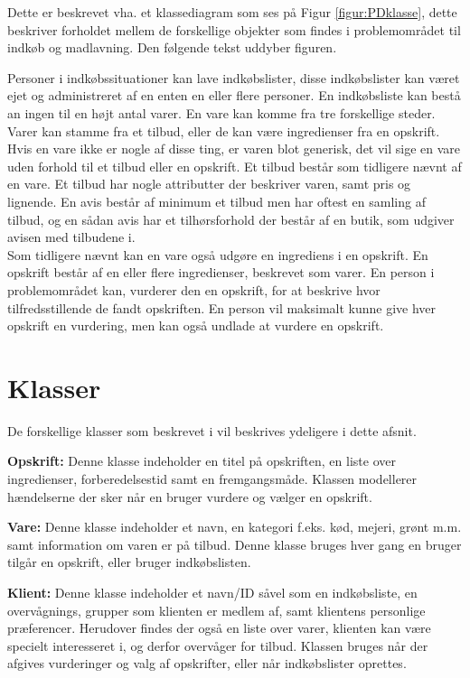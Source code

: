 Dette er beskrevet vha. et klassediagram som ses på Figur \ref{figur:PDklasse}, dette beskriver forholdet mellem de forskellige objekter som findes i problemområdet til indkøb og madlavning. Den følgende tekst uddyber figuren.

Personer i indkøbssituationer kan lave indkøbslister, disse indkøbslister kan været ejet og administreret af en enten en eller flere personer. 
En indkøbsliste kan bestå an ingen til en højt antal varer.
En vare kan komme fra tre forskellige steder.
Varer kan stamme fra et tilbud, eller de kan være ingredienser fra en opskrift. 
Hvis en vare ikke er nogle af disse ting, er varen blot generisk, det vil sige en vare uden forhold til et tilbud eller en opskrift.
Et tilbud består som tidligere nævnt af en vare.
Et tilbud har nogle attributter der beskriver varen, samt pris og lignende.
En avis består af minimum et tilbud men har oftest en samling af tilbud, og en sådan avis har et tilhørsforhold der består af en butik, som udgiver avisen med tilbudene i.\\
Som tidligere nævnt kan en vare også udgøre en ingrediens i en opskrift.
En opskrift består af en eller flere ingredienser, beskrevet som varer.
En person i problemområdet kan, vurderer den en opskrift, for at beskrive hvor tilfredsstillende de fandt opskriften.
En person vil maksimalt kunne give hver opskrift en vurdering, men kan også undlade at vurdere en opskrift.

\section{Klasser}
De forskellige klasser som beskrevet i  vil beskrives ydeligere i dette afsnit.

\textbf{Opskrift:}
Denne klasse indeholder en titel på opskriften, en liste over ingredienser, forberedelsestid samt en fremgangsmåde. Klassen modellerer hændelserne der sker når en bruger vurdere og vælger en opskrift.

\textbf{Vare:}
Denne klasse indeholder et navn, en kategori f.eks. kød, mejeri, grønt m.m. samt information om varen er på tilbud. Denne klasse bruges hver gang en bruger tilgår en opskrift, eller bruger indkøbslisten.

\textbf{Klient:}
Denne klasse indeholder et navn/ID såvel som en indkøbsliste, en overvågnings, grupper som klienten er medlem af, samt klientens personlige præferencer. Herudover findes der også en liste over varer, klienten kan være specielt interesseret i, og derfor overvåger for tilbud. Klassen bruges når der afgives vurderinger og valg af opskrifter, eller når indkøbslister oprettes. 

